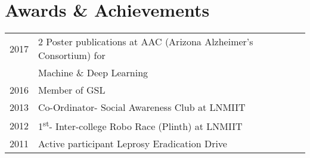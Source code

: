 \documentclass[hidelinks,letterpaper]{deedy-resume-openfont} %
\begin{document}
\begin{minipage}[t]{0.66\textwidth}
		
		
		\sectionsep
		
		\section{Awards \& Achievements} 
		
		\begin{tabular}{rll}
			2017	& 2 Poster publications at AAC (Arizona Alzheimer's Consortium) for \\
					& Machine   \& Deep Learning  \\ 
			2016    & Member of GSL \\
			2013	& Co-Ordinator- Social Awareness Club at LNMIIT\\
			2012	& 1\textsuperscript{st}- Inter-college Robo Race (Plinth) at LNMIIT\\
			2011	& Active participant Leprosy Eradication Drive
		\end{tabular}
		
		
	\end{minipage} %
	
	
	
	
	
\end{document}
